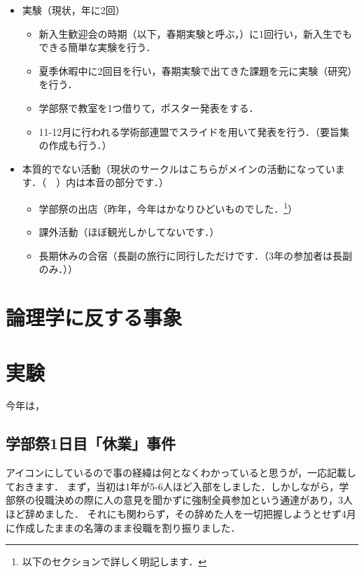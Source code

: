 \documentclass[a4paper,11pt]{ltjsarticle}
\begin{document}
\begin{itemize}
    \item 実験（現状，年に2回）
    \begin{itemize}
        \item 新入生歓迎会の時期（以下，春期実験と呼ぶ，）に1回行い，新入生でもできる簡単な実験を行う．
        \item 夏季休暇中に2回目を行い，春期実験で出てきた課題を元に実験（研究）を行う．
        \item 学部祭で教室を1つ借りて，ポスター発表をする．
        \item 11-12月に行われる学術部連盟でスライドを用いて発表を行う．（要旨集の作成も行う．）
    \end{itemize}
\clearpage
    \item 本質的でない活動（現状のサークルはこちらがメインの活動になっています．（　）内は本音の部分です．）
    \begin{itemize}
        \item 学部祭の出店（昨年，今年はかなりひどいものでした．\footnote{以下のセクションで詳しく明記します．}）
        \item 課外活動（ほぼ観光しかしてないです．）
        \item 長期休みの合宿（長副の旅行に同行しただけです．（3年の参加者は長副のみ．））
    \end{itemize}
\end{itemize}

\section{論理学に反する事象}

\section{実験}

今年は，

\subsection{学部祭1日目「休業」事件}

アイコンにしているので事の経緯は何となくわかっていると思うが，一応記載しておきます．
まず，当初は1年が5-6人ほど入部をしました．しかしながら，学部祭の役職決めの際に人の意見を聞かずに強制全員参加という通達があり，3人ほど辞めました．
それにも関わらず，その辞めた人を一切把握しようとせず4月に作成したままの名簿のまま役職を割り振りました．
\end{document}
